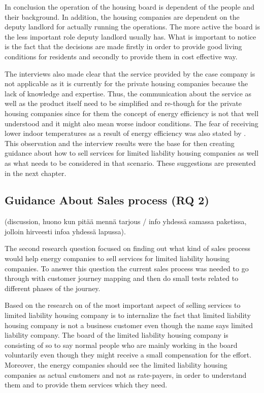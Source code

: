 In conclusion the operation of the housing board is dependent of the people and their background. In addition, the housing companies are dependent on the deputy landlord for actually running the operations. The more active the board is the less important role deputy landlord usually has. What is important to notice is the fact that the decisions are made firstly in order to provide good living conditions for residents and secondly to provide them in cost effective way.

The interviews also made clear that the service provided by the case company is not applicable as it is currently for the private housing companies because the lack of knowledge and expertise. Thus, the communication about the service  as well as the product itself need to be simplified and re-though for the private housing companies since for them the concept of energy efficiency is not that well understood and it might also mean worse indoor conditions. The fear of receiving lower indoor temperatures as a result of energy efficiency was also stated by \textcite{PehkonenThesis:2012}. This observation and the interview results were the base for then creating guidance about how to sell services for limited liability housing companies as well as what needs to be considered in that scenario. These suggestions are presented in the next chapter.

\subsection{Guidance About Sales process (RQ 2)}

(discussion, huono kun pitää mennä tarjous / info yhdessä samassa paketissa, jolloin hirveesti infoa yhdessä lapussa).

The second research question focused on finding out what kind of sales process would help energy companies to sell services for limited liability housing companies. To answer this question the current sales process was needed to go through with customer journey mapping and then do small tests related to different phases of the journey.

Based on the research on of the most important aspect of selling services to limited liability housing company is to internalize the fact that limited liability housing company is not a business customer even though the name says limited liability company. The board of the limited liability housing company is consisting of so to say normal people who are mainly working in the board voluntarily even though they might receive a small compensation for the effort. Moreover, the energy companies should see the limited liability housing companies as actual customers and not as rate-payers, in order to understand them and to provide them services which they need.

